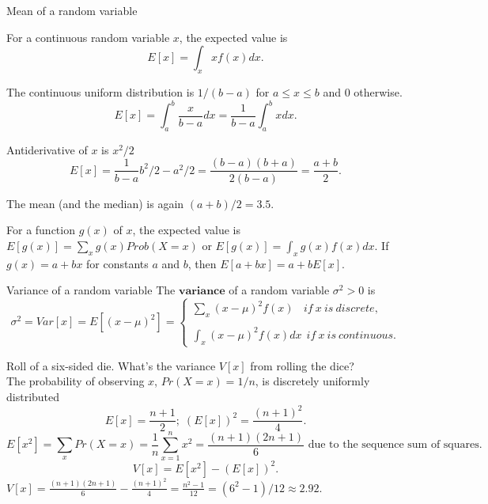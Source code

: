 \documentclass[11pt,table]{beamer}
\begin{document}
\begin{frame}{Mean of a random variable}

For a continuous random variable $x$, the expected value is $$E[x]={\int_{x}xf(x)dx.}$$

\begin{example} 
\scriptsize
\renewcommand{\baselinestretch}{1}
The continuous uniform distribution is $1/(b-a)$ for $a\leq x\leq b$ and $0$ otherwise.\\

$$E[x]={\int_{a}^b\frac{x}{b-a}dx}={\frac{1}{b-a}\int_{a}^bxdx}.$$

Antiderivative of $x$ is $x^2/2$
$$E[x]={\frac{1}{b-a} b^2/2-a^2/2}=\frac{(b-a)(b+a)}{2(b-a)}=\frac{a+b}{2}.$$


The mean (and the median) is again $(a+b)/2=3.5$.
\end{example}
\scriptsize
For a function $g(x)$ of $x$, the expected value is $E[g(x)]=\sum_{x}g(x) Prob(X = x)$ or $E[g(x)]=\int_{x}g(x)f(x)dx$. If $g(x) = a + bx$ for constants $a$ and $b$, then $E[a + bx] = a + bE[x]$.
\end{frame}



\begin{frame}{Variance of a random variable}
The $\textbf{variance}$ of a random variable $\sigma^{2}>0$ is
\begin{equation}\label{eq0} \sigma^2=Var[x] = E[(x - \mu)^{2}]=\left\{
 \begin{array}{ll}
 {\sum_{x}(x - \mu)^{2}f(x)~~~~if~ x~ is~ discrete, } \\
 {~}\\
 {\int_{x}(x - \mu)^{2}f(x)dx~~if~ x~ is~ continuous.}
 \end{array}
 \right.
\end{equation}
\begin{example} 
\scriptsize
\renewcommand{\baselinestretch}{1}
Roll of a six-sided die. What's the variance $V[x]$ from rolling the dice?\\
The probability of observing $x$, $Pr(X=x)=1/n$, is discretely uniformly distributed
$$E[x]=\frac{n+1}{2}; \; (E[x])^2=\frac{(n+1)^2}{4}.$$
$$E[x^2]=\sum_xPr(X=x)=\frac{1}{n}\sum_{x=1}^nx^2=\frac{(n+1)(2n+1)}{6} \text{ due to the sequence sum of squares}.$$
$$V[x] = E[x^{2}] - (E[x])^2.$$
 $V[x]=\frac{(n+1)(2n+1)}{6}-\frac{(n+1)^2}{4}=\frac{n^2-1}{12}=(6^2-1)/12\approx2.92.$\\
\end{example}

\end{frame}
\end{document}
